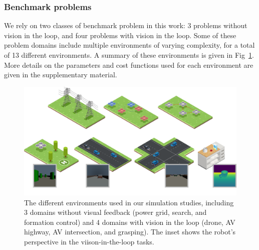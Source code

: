 \subsubsection{Benchmark problems}

We rely on two classes of benchmark problem in this work: 3 problems without vision in the loop, and four problems with vision in the loop. Some of these problem domains include multiple environments of varying complexity, for a total of 13 different environments. A summary of these environments is given in Fig~\ref{ch:corl:fig:environments}. More details on the parameters and cost functions used for each environment are given in the supplementary material.

\begin{figure}[t]
    \centering
    \includegraphics[width=\linewidth]{images/corl/all_examples.png}
    \caption{The different environments used in our simulation studies, including 3 domains without visual feedback (power grid, search, and formation control) and 4 domains with vision in the loop (drone, AV highway, AV intersection, and grasping). The inset shows the robot's perspective in the viison-in-the-loop tasks.}\label{ch:corl:fig:environments}
\end{figure}

